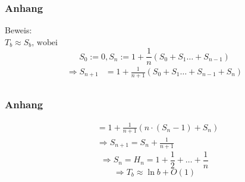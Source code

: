 \documentclass[•]{beamer}
\begin{document}
\begin{frame}
\frametitle{Anhang}
	Beweis:\\
	$ T_b \approx S_b \text{, wobei }$ $$S_0 := 0, S_n := 1 + \frac{1}{n} (S_0 + S_1 \dots + S_{n-1})$$
	\begin{align*}
	\Rightarrow S_{n+1} &= 1 + \frac{1}{n+1}(S_0 + S_1 \dots + S_{n-1}+ S_n)\\
	\end{align*}
	
\end{frame}

\begin{frame}
\frametitle{Anhang}
\begin{align*}
&= 1 + \frac{1}{n+1}(n\cdot (S_n - 1) + S_n)\\
	&\Rightarrow S_{n+1}= S_n + \frac{1}{n+1}
\end{align*}
$$\Rightarrow S_n = H_n = 1 + \frac{1}{2} + \dots +\frac{1}{n}$$ $$ \Rightarrow T_b \approx \ln b + O(1)$$

\end{frame}
\end{document}
